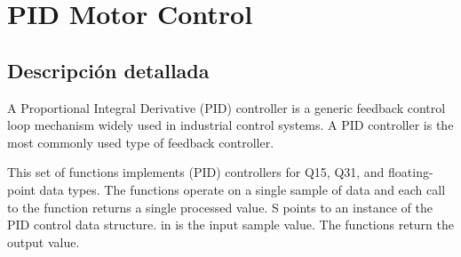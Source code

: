 \hypertarget{group___p_i_d}{}\section{P\+ID Motor Control}
\label{group___p_i_d}


\subsection{Descripción detallada}
A Proportional Integral Derivative (P\+ID) controller is a generic feedback control loop mechanism widely used in industrial control systems. A P\+ID controller is the most commonly used type of feedback controller.

This set of functions implements (P\+ID) controllers for Q15, Q31, and floating-\/point data types. The functions operate on a single sample of data and each call to the function returns a single processed value. {\ttfamily S} points to an instance of the P\+ID control data structure. {\ttfamily in} is the input sample value. The functions return the output value.

